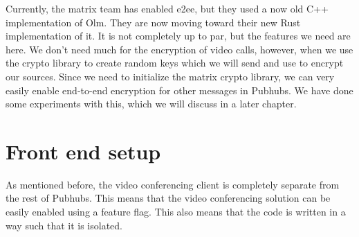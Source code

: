 \documentclass{report}
\begin{document}
    Currently, the matrix team has enabled e2ee, but they used a now old C++ implementation of Olm. They are now moving
    toward their new Rust implementation of it. It is not completely up to par, but the features we need are here. We
    don't need much for the encryption of video calls, however, when we use the crypto library to create random keys
    which we will send and use to encrypt our sources. Since we need to initialize the matrix crypto library, we can
    very easily enable end-to-end encryption for other messages in Pubhubs. We have done some experiments with this,
    which we will discuss in a later chapter.

    \section{Front end setup}
    As mentioned before, the video conferencing client is completely separate from the rest of Pubhubs. This means that
    the video conferencing solution can be easily enabled using a feature flag. This also means that the code is
    written in a way such that it is isolated.





\end{document}
